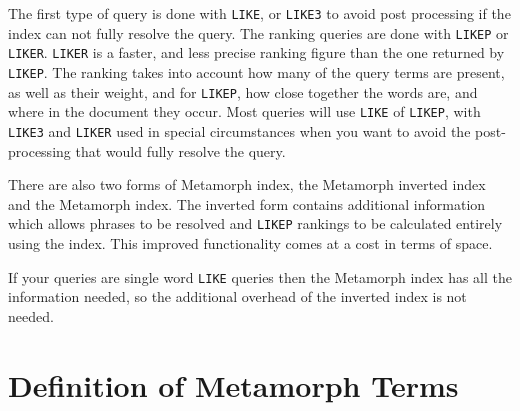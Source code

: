 The first type of query is done with \verb`LIKE`, or \verb`LIKE3` to avoid post processing
if the index can not fully resolve the query.  The ranking queries are done
with \verb`LIKEP` or \verb`LIKER`.  \verb`LIKER` is a faster, and less precise ranking figure
than the one returned by \verb`LIKEP`.  The ranking takes into account how many of
the query terms are present, as well as their weight, and for \verb`LIKEP`, how
close together the words are, and where in the document they occur.  Most
queries will use \verb`LIKE` of \verb`LIKEP`, with \verb`LIKE3` and \verb`LIKER` used in special
circumstances when you want to avoid the post-processing that would fully
resolve the query.

There are also two forms of Metamorph index, the Metamorph inverted index
and the Metamorph index.  The inverted form contains additional information
which allows phrases to be resolved and \verb`LIKEP` rankings to be calculated
entirely using the index.  This improved functionality comes at a cost in
terms of space.

If your queries are single word \verb`LIKE` queries then the Metamorph
index has all the information needed, so the additional overhead of
the inverted index is not needed.

\section{Definition of Metamorph Terms}

